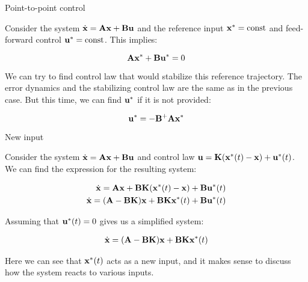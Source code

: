 \documentclass{beamer}
\begin{document}
\begin{frame}{Point-to-point control}
	\begin{flushleft}
		
		Consider the system $\dot{\mathbf{x}} = \mathbf{A}\mathbf{x} + \mathbf{B}\mathbf{u}$ and the reference input $\mathbf{x}^* = \text{const}$ and feed-forward control $\mathbf{u}^*= \text{const}$. This implies:
		
		\begin{equation}
			\mathbf{A}\mathbf{x}^* + \mathbf{B}\mathbf{u}^* = 0
		\end{equation}		
		
		We can try to find control law that would stabilize this reference trajectory. The error dynamics and the stabilizing control law are the same as in the previous case. But this time, we can find $\mathbf{u}^*$ if it is not provided:
		
		\begin{equation}
			 \mathbf{u}^* = -\mathbf{B}^+\mathbf{A}\mathbf{x}^*
		\end{equation}				
		
	\end{flushleft}
\end{frame}



\begin{frame}{New input}
	\begin{flushleft}
		
		Consider the system $\dot{\mathbf{x}} = \mathbf{A}\mathbf{x} + \mathbf{B}\mathbf{u}$ and control law $\mathbf{u} = \mathbf{K}(\mathbf{x}^*(t) - \mathbf{x}) + \mathbf{u}^*(t)$. We can find the expression for the resulting system:
		
		\begin{align}
			\dot{\mathbf{x}} = \mathbf{A}\mathbf{x} + \mathbf{B}\mathbf{K}(\mathbf{x}^*(t) - \mathbf{x}) + \mathbf{B}\mathbf{u}^*(t) \\
			\dot{\mathbf{x}} = (\mathbf{A}- \mathbf{B}\mathbf{K})\mathbf{x} +\mathbf{B}\mathbf{K}\mathbf{x}^*(t) + \mathbf{B}\mathbf{u}^*(t)
		\end{align}		
		
		Assuming that $\mathbf{u}^*(t) = 0$ gives us a simplified system:
		
		\begin{align}
			\dot{\mathbf{x}} =  (\mathbf{A}- \mathbf{B}\mathbf{K})\mathbf{x} +\mathbf{B}\mathbf{K}\mathbf{x}^*(t)
		\end{align}				
		
		Here we can see that $\mathbf{x}^*(t)$ acts as a new input, and it makes sense to discuss how the system reacts to various inputs.
		
	\end{flushleft}
\end{frame}
\end{document}
